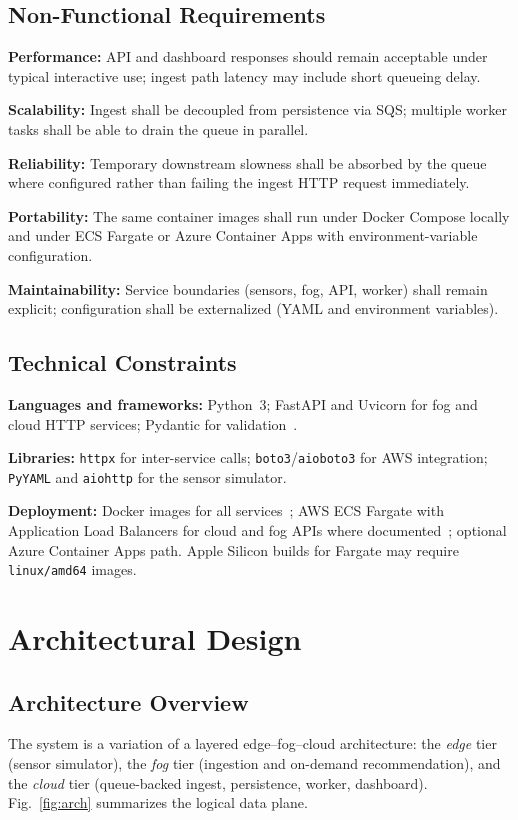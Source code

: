 \documentclass[conference]{IEEEtran}
\begin{document}
\subsection{Non-Functional Requirements}
\textbf{Performance:} API and dashboard responses should remain acceptable under typical interactive use; ingest path latency may include short queueing delay.

\textbf{Scalability:} Ingest shall be decoupled from persistence via SQS; multiple worker tasks shall be able to drain the queue in parallel.

\textbf{Reliability:} Temporary downstream slowness shall be absorbed by the queue where configured rather than failing the ingest HTTP request immediately.

\textbf{Portability:} The same container images shall run under Docker Compose locally and under ECS Fargate or Azure Container Apps with environment-variable configuration.

\textbf{Maintainability:} Service boundaries (sensors, fog, API, worker) shall remain explicit; configuration shall be externalized (YAML and environment variables).

\subsection{Technical Constraints}
\textbf{Languages and frameworks:} Python~3; FastAPI and Uvicorn for fog and cloud HTTP services; Pydantic for validation~\cite{fastapi}.

\textbf{Libraries:} \texttt{httpx} for inter-service calls; \texttt{boto3}/\texttt{aioboto3} for AWS integration; \texttt{PyYAML} and \texttt{aiohttp} for the sensor simulator.

\textbf{Deployment:} Docker images for all services~\cite{docker}; AWS ECS Fargate with Application Load Balancers for cloud and fog APIs where documented~\cite{ecs}; optional Azure Container Apps path. Apple Silicon builds for Fargate may require \texttt{linux/amd64} images.

\section{Architectural Design}

\subsection{Architecture Overview}
The system is a variation of a layered edge--fog--cloud architecture: the \emph{edge} tier (sensor simulator), the \emph{fog} tier (ingestion and on-demand recommendation), and the \emph{cloud} tier (queue-backed ingest, persistence, worker, dashboard). Fig.~\ref{fig:arch} summarizes the logical data plane.
\end{document}

